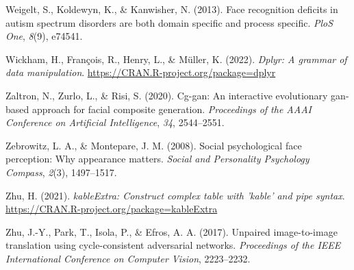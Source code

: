 \documentclass[
  man,floatsintext]{apa6}
\newlength{\cslhangindent}
\newlength{\cslentryspacingunit} %
\newenvironment{CSLReferences}[2] %
 {%
  \setlength{\parindent}{0pt}
  \ifodd #1
  \let\oldpar\par
  \def\par{\hangindent=\cslhangindent\oldpar}
  \fi
  \setlength{\parskip}{#2\cslentryspacingunit}
 }%
 {}
\begin{document}
\begin{CSLReferences}{1}{0}
\leavevmode{}%
Weigelt, S., Koldewyn, K., \& Kanwisher, N. (2013). Face recognition deficits in autism spectrum disorders are both domain specific and process specific. \emph{PloS One}, \emph{8}(9), e74541.

\leavevmode{}%
Wickham, H., François, R., Henry, L., \& Müller, K. (2022). \emph{Dplyr: A grammar of data manipulation}. \url{https://CRAN.R-project.org/package=dplyr}

\leavevmode{}%
Zaltron, N., Zurlo, L., \& Risi, S. (2020). Cg-gan: An interactive evolutionary gan-based approach for facial composite generation. \emph{Proceedings of the AAAI Conference on Artificial Intelligence}, \emph{34}, 2544--2551.

\leavevmode{}%
Zebrowitz, L. A., \& Montepare, J. M. (2008). Social psychological face perception: Why appearance matters. \emph{Social and Personality Psychology Compass}, \emph{2}(3), 1497--1517.

\leavevmode{}%
Zhu, H. (2021). \emph{kableExtra: Construct complex table with 'kable' and pipe syntax}. \url{https://CRAN.R-project.org/package=kableExtra}

\leavevmode{}%
Zhu, J.-Y., Park, T., Isola, P., \& Efros, A. A. (2017). Unpaired image-to-image translation using cycle-consistent adversarial networks. \emph{Proceedings of the IEEE International Conference on Computer Vision}, 2223--2232.

\end{CSLReferences}

\endgroup
\end{document}
